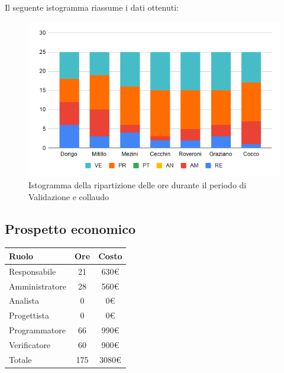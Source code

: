 {{{{{{{{{Il seguente istogramma riassume i dati ottenuti:
\begin{figure}[!ht]
	\begin{center}
		\includegraphics[width=0.8\linewidth]{../immagini/pdp/istogramma_validazione.png}
		\caption{Istogramma della ripartizione delle ore durante il periodo di Validazione e
			collaudo}
	\end{center}
\end{figure}

\subsection{Prospetto economico}\label{PreventivoPreventivoFaseDiProgettazionediValidazioneECollaudoProspettoEconomico}
\quad
\def\tabularxcolumn#1{m{#1}}
{
	\begin{center}
		\renewcommand{\arraystretch}{1.4}
		\begin{tabularx}{7cm}{|X|c|c|}
			\hline
			\rowcolor{airforceblue}
			\textbf{Ruolo} & \textbf{Ore} & \textbf{Costo}\\
			\hline
			Responsabile & 21 & 630\euro\\
			\hline
			Amministratore & 28 & 560\euro\\
			\hline
			Analista & 0 & 0\euro\\
			\hline
			Progettista & 0 & 0\euro\\
			\hline
			Programmatore & 66 & 990\euro\\
			\hline
			Verificatore & 60 & 900\euro\\
			\hline
			Totale & 175 & 3080\euro\\
			\hline
		\end{tabularx}
	\end{center}

}}}}}}}}}}
